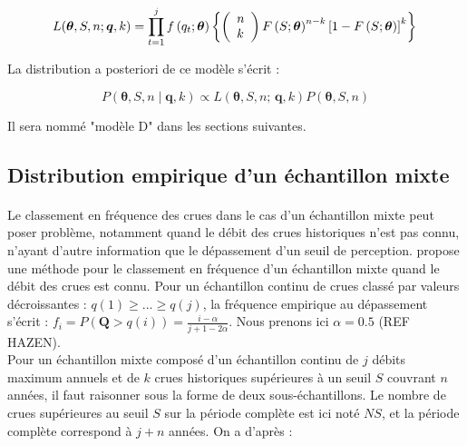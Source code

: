 \documentclass[11pt]{article}
\begin{document}
					\begin{equation}
			L(\boldsymbol{\theta}, S, n ; \boldsymbol{q}, k) = \prod_{t=1}^j f\left(q_t;\boldsymbol{\theta}\right) \left\{\left(\begin{array}{l}
			n \\
			k
			\end{array}\right) F\left(S;\boldsymbol{\theta}\right)^{n-k}\left[1-F\left(S;\boldsymbol{\theta}\right)\right]^k\right\} \\
			\label{eq:Gev_Binom_SN}
			\end{equation}
		
		La distribution a posteriori de ce modèle s'écrit :
					
			\begin{equation}
				P(\boldsymbol{\theta}, S, n \mid \boldsymbol{q},k) \propto L(\boldsymbol{\theta},S, n;\,\boldsymbol{q},k) P(\boldsymbol{\theta},S, n)
				\label{eq:Bayes_uSN}
			\end{equation}

	Il sera nommé "modèle D" dans les sections suivantes. 

	\subsection{Distribution empirique d'un échantillon mixte}
	
		\paragraph{} Le classement en fréquence des crues dans le cas d'un échantillon mixte peut poser problème, notamment quand le débit des crues historiques n'est pas connu, n'ayant d'autre information que le dépassement d'un seuil de perception. \citet{hirsch_probability_1987} propose une méthode pour le classement en fréquence d'un échantillon mixte quand le débit des crues est connu. Pour un échantillon continu de crues classé par valeurs décroissantes : $q(1) \geq ... \geq q(j)$, la fréquence empirique au dépassement s'écrit : $f_i = P(\boldsymbol{Q} > q(i)) = \frac{i-\alpha}{j+1-2\alpha}$. Nous prenons ici $\alpha = 0.5$ (REF HAZEN). \\
		Pour un échantillon mixte composé d'un échantillon continu de $j$ débits maximum annuels et de $k$ crues historiques supérieures à un seuil $S$ couvrant $n$ années, il faut raisonner sous la forme de deux sous-échantillons. Le nombre de crues supérieures au seuil $S$ sur la période complète est ici noté $NS$, et la période complète correspond à $j + n$ années. On a d'après \citet{hirsch_probability_1987} :
		
\end{document}
